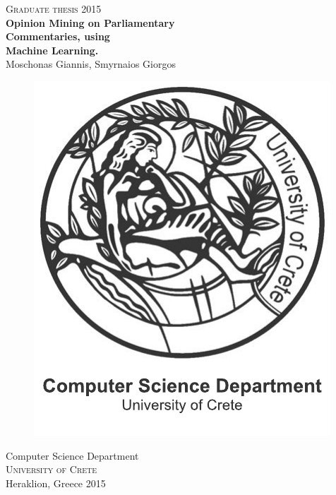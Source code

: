 \newpage
\restoregeometry
\thispagestyle{empty}
\mbox{}


\newpage
\thispagestyle{empty}
\begin{center}
	\textsc{\large Graduate thesis 2015}\\[4cm]		%
	\textbf{\Large Opinion Mining on Parliamentary\\Commentaries, using\\Machine Learning.} \\[1cm]
	{\large Moschonas Giannis, Smyrnaios Giorgos}
	
	\vfill	
	\begin{figure}[H]
	\centering
	\includegraphics[width=0.2\pdfpagewidth]{figure/auxiliary/logo_eng.pdf} \\	
	\end{figure}	\vspace{5mm}	
	
	Computer Science Department \\
	\textsc{University of Crete} \\
	Heraklion, Greece 2015 \\
\end{center}


